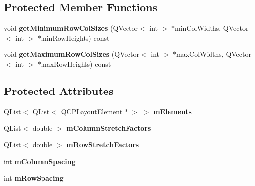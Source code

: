 \subsection*{Protected Member Functions}
\begin{DoxyCompactItemize}
\item 
\hypertarget{classQCPLayoutGrid_ac645fb9b1c4257b08a9f09dee10b9b3f}{}void {\bfseries get\+Minimum\+Row\+Col\+Sizes} (Q\+Vector$<$ int $>$ $\ast$min\+Col\+Widths, Q\+Vector$<$ int $>$ $\ast$min\+Row\+Heights) const \label{classQCPLayoutGrid_ac645fb9b1c4257b08a9f09dee10b9b3f}

\item 
\hypertarget{classQCPLayoutGrid_af348d903e3b8bc416f1fe1b8125d1173}{}void {\bfseries get\+Maximum\+Row\+Col\+Sizes} (Q\+Vector$<$ int $>$ $\ast$max\+Col\+Widths, Q\+Vector$<$ int $>$ $\ast$max\+Row\+Heights) const \label{classQCPLayoutGrid_af348d903e3b8bc416f1fe1b8125d1173}

\end{DoxyCompactItemize}
\subsection*{Protected Attributes}
\begin{DoxyCompactItemize}
\item 
\hypertarget{classQCPLayoutGrid_a3577d3855bf8ad20ef9079291a49f397}{}Q\+List$<$ Q\+List$<$ \hyperlink{classQCPLayoutElement}{Q\+C\+P\+Layout\+Element} $\ast$ $>$ $>$ {\bfseries m\+Elements}\label{classQCPLayoutGrid_a3577d3855bf8ad20ef9079291a49f397}

\item 
\hypertarget{classQCPLayoutGrid_ac6aabe62339f94f18b9f8adab94b1840}{}Q\+List$<$ double $>$ {\bfseries m\+Column\+Stretch\+Factors}\label{classQCPLayoutGrid_ac6aabe62339f94f18b9f8adab94b1840}

\item 
\hypertarget{classQCPLayoutGrid_a36c85a7eaf342680fb9b8a4977486f16}{}Q\+List$<$ double $>$ {\bfseries m\+Row\+Stretch\+Factors}\label{classQCPLayoutGrid_a36c85a7eaf342680fb9b8a4977486f16}

\item 
\hypertarget{classQCPLayoutGrid_ae9ac48f0791be07ead0a96dbd5622770}{}int {\bfseries m\+Column\+Spacing}\label{classQCPLayoutGrid_ae9ac48f0791be07ead0a96dbd5622770}

\item 
\hypertarget{classQCPLayoutGrid_a8b67f183f4645739cc4c794d75843b40}{}int {\bfseries m\+Row\+Spacing}\label{classQCPLayoutGrid_a8b67f183f4645739cc4c794d75843b40}

\end{DoxyCompactItemize}
